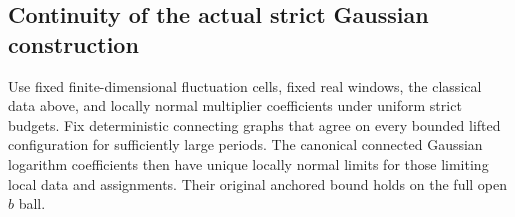 \subsection{Continuity of the actual strict Gaussian construction}
\label{qll-Gaussian-section}

\begin{lemma}
\label{qll-Gaussian-lemma}
Use fixed finite-dimensional fluctuation cells, fixed real
windows, the classical data above, and locally normal multiplier
coefficients under uniform strict budgets. Fix deterministic
connecting graphs that agree on every bounded lifted
configuration for sufficiently large periods. The canonical
connected Gaussian logarithm coefficients then have unique
locally normal limits for those limiting local data and
assignments. Their original anchored bound holds on the full
open \(b\) ball.
\end{lemma}

